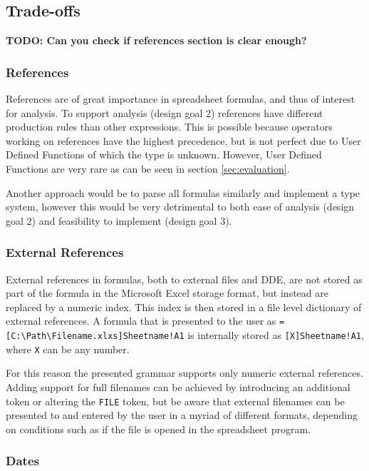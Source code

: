 \documentclass[conference]{IEEEtran}
\newcommand{\todo}[1]{\textbf{TODO: #1}}
\begin{document}
\subsection{Trade-offs}

\todo{Can you check if references section is clear enough?}

\subsubsection{\textbf{References}}
\label{tradeoff:references}

References are of great importance in spreadsheet formulas, and thus of interest for analysis.
To support analysis (design goal 2) references have different production rules than other expressions.
This is possible because operators working on references have the highest precedence, but is not perfect due to User Defined Functions of which the type is unknown.
However, User Defined Functions are very rare as can be seen in section \ref{sec:evaluation}.

Another approach would be to parse all formulas similarly and implement a type system, however this would be very detrimental to both ease of analysis (design goal 2) and feasibility to implement (design goal 3).

\subsubsection{\textbf{External References}}

External references in formulas, both to external files and DDE, are not stored as part of the formula in the Microsoft Excel storage format, but instead are replaced by a numeric index.
This index is then stored in a file level dictionary of external references.
A formula that is presented to the user as \texttt{=[C:\textbackslash Path\textbackslash Filename.xlxs]Sheetname!A1} is internally stored as \texttt{[X]Sheetname!A1}, where \texttt{X} can be any number.

For this reason the presented grammar supports only numeric external references.
Adding support for full filenames can be achieved by introducing an additional token or altering the \texttt{FILE} token, but be aware that external filenames can be presented to and entered by the user in a myriad of different formats, depending on conditions such as if the file is opened in the spreadsheet program.

\subsubsection{\textbf{Dates}}
\end{document}

